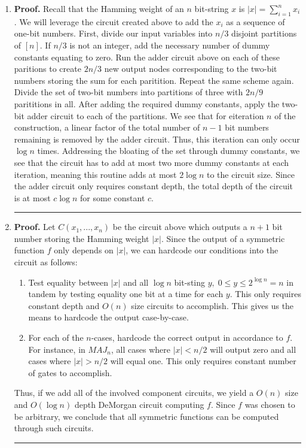 \documentclass[12pt]{article}%
\newenvironment{proof}[1][Proof]{\textbf{#1.} }{\ \rule{0.5em}{0.5em}}
\begin{document}
\begin{enumerate}
\begin{proof}
    In addition, for $n$-bit numbers $x,y,z$, we can simply output $x+y$ through the adder and separately output $z$ as an $n+1$-bit number by prefixing $z$ with 0.
  \end{proof}
  \item
  \begin{proof}
    Recall that the Hamming weight of an $n$ bit-string $x$ is $|x| = \sum
    _{i=1}^nx_i$. We will leverage the circuit created above to add the $x_i$ as a sequence of one-bit numbers. First, divide our input variables into $n/3$ disjoint partitions of $[n]$. If $n/3$ is not an integer, add the necessary number of dummy constants equating to zero. Run the adder circuit above on each of these paritions to create $2n/3$ new output nodes corresponding to the two-bit numbers storing the sum for each paritition. Repeat the same scheme again. Divide the set of two-bit numbers into partitions of three with $2n/9$ parititions in all. After adding the required dummy constants, apply the two-bit adder circuit to each of the partitions. We see that for eiteration $n$ of the construction, a linear factor of the total number of $n-1$ bit numbers remaining is removed by the adder circuit. Thus, this iteration can only occur $\log n$ times. Addressing the bloating of the set through dummy constants, we see that the circuit has to add at most two more dummy constants at each iteration, meaning this routine adds at most $2\log n$ to the circuit size. Since the adder circuit only requires constant depth, the total depth of the circuit is at most $c \log n$ for some constant $c$.
  \end{proof}
  \item
  \begin{proof}
    Let $C(x_1,...,x_n)$ be the circuit above which outputs a $n+1$ bit number storing the Hamming weight $|x|$. Since the output of a symmetric function $f$ only depends on $|x|$, we can hardcode our conditions into the circuit as follows:
    \begin{enumerate}
       \item Test equality between $|x|$ and all $\log n$ bit-sting $y, \; 0 \leq y \leq 2^{\log n} = n$ in tandem by testing equality one bit at a time for each $y$. This only requires constant depth and $O(n)$ size circuits to accomplish. This gives us the means to hardcode the output case-by-case.
       \item For each of the $n$-cases, hardcode the correct output in accordance to $f$. For instance, in $MAJ_n$, all cases where $|x| < n/2$ will output zero and all cases where $|x| > n/2$ will equal one. This only requires constant number of gates to accomplish.
    \end{enumerate}
    Thus, if we add all of the involved component circuits, we yield a $O(n)$ size and $O(\log n)$ depth DeMorgan circuit computing $f$. Since $f$ was chosen to be arbitrary, we conclude that all symmetric functions can be computed through such circuits.
  \end{proof}
\end{enumerate}
\end{document}

